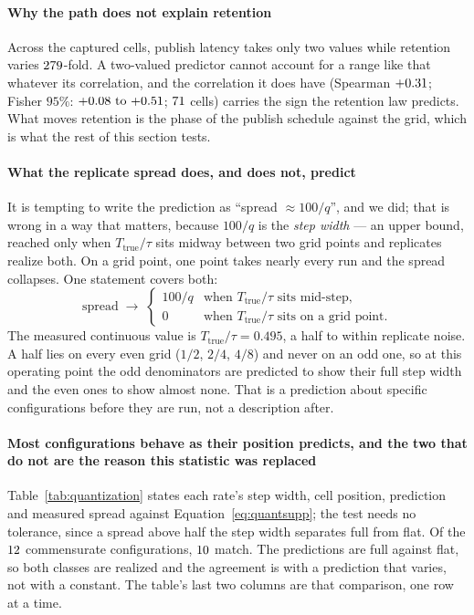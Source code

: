 \documentclass[10pt,journal,onecolumn]{IEEEtran}
\begin{document}
\paragraph{Why the path does not explain retention} Across the captured cells, publish latency
takes only two values while retention varies $279$-fold. A two-valued predictor
cannot account for a range like that whatever its correlation, and the correlation it does have
(Spearman $+0.31$; Fisher $95\%$: $\ombRetentionRhoCI$; $71$ cells)
carries the sign the retention law predicts. What moves retention is the phase of the publish schedule against the grid, which is what the rest of this section tests.

\paragraph{What the replicate spread does, and does not, predict} It is tempting to write
the prediction as ``spread $\approx 100/q$'', and we did; that is wrong in a way that matters,
because $100/q$ is the \emph{step width} --- an upper bound, reached only when
$T_{\mathrm{true}}/\tau$ sits midway between two grid points and replicates realize both.
On a grid point, one point takes nearly every run and the spread collapses. One statement
covers both:
\begin{equation}
\label{eq:quantsupp}
\text{spread} \;\longrightarrow\;
\begin{cases}
100/q & \text{when } T_{\mathrm{true}}/\tau \text{ sits mid-step,}\\[2pt]
0 & \text{when } T_{\mathrm{true}}/\tau \text{ sits on a grid point.}
\end{cases}
\end{equation}
The measured continuous value is $T_{\mathrm{true}}/\tau = 0.495$, a half to within replicate noise.
A half lies on every even grid ($1/2$, $2/4$, $4/8$) and never on an odd one, so at this operating
point the odd denominators are predicted to show their full step width and the even ones to show
almost none. That is a prediction about specific configurations before they are run, not a description after.

\paragraph{Most configurations behave as their position predicts, and the two that do not are the
reason this statistic was replaced} Table~\ref{tab:quantization} states each rate's step width, cell position, prediction and measured spread against Equation~\ref{eq:quantsupp}; the
test needs no tolerance, since a spread above half the step width separates full from flat.
Of the $12$ commensurate configurations, $10$ match. The predictions are
\spreadPredFullWord{} full against \spreadPredFlatWord{} flat, so both classes are realized
and the agreement is with a prediction that varies, not with a constant. The table's last two
columns are that comparison, one row at a time.
\end{document}
